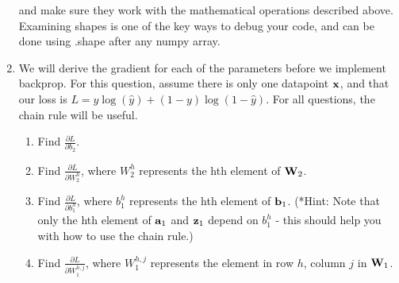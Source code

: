 \documentclass[submit]{harvardml}
\begin{document}
\begin{problem}[Backprop]
\begin{enumerate}
      and make sure they work with the mathematical operations described above. Examining shapes is one of the key ways to debug your code, and can be done using .shape after any numpy array.
      
    \item  We will derive the gradient for each of the parameters before we implement backprop. For this question, assume there is only one datapoint $\bold{x}$, and that our loss is $L = y \log (\hat{y}) + (1 - y) \log (1 - \hat{y})$. For all questions, the chain rule will be useful.
    \begin{enumerate}
        \item Find $\frac{\partial L}{\partial b_2}$. 
        
        \item Find $\frac{\partial L}{\partial W_2^h}$, where $W_2^h$ represents the hth element of $\bold{W}_2$.
        
        \item Find $\frac{\partial L}{\partial b_1^h}$, where $b_1^h$ represents the hth element of $\bold{b}_1$. (*Hint: Note that only the hth element of $\bold{a}_1$ and $\bold{z}_1$ depend on $b_1^h$ - this should help you with how to use the chain rule.)
        
        \item Find $\frac{\partial L}{\partial W_1^{h,j}}$, where  $W_1^{h,j}$ represents the element in row $h$, column $j$ in $\bold{W}_1$.
    
    \end{enumerate}
    \end{enumerate}
    
    \end{problem}
    \setcounter{problem}{1}
\end{document}
